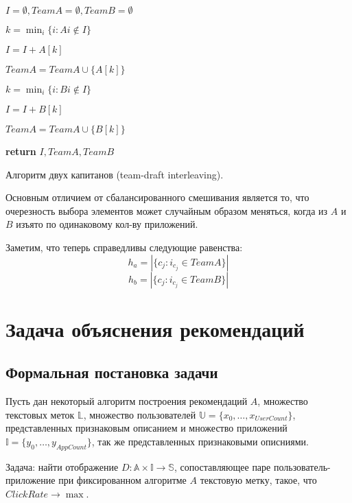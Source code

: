 \documentclass[12pt,a4paper]{report}
\begin{document}
\begin{algorithm}[H]
\SetAlgoLined
{}
$I = \emptyset, TeamA = \emptyset, TeamB = \emptyset$

 {
	 {
		$k=\min_i\{i: A{i}\notin I\}$
		
		$I = I + A[k]$
		
		$TeamA = TeamA \cup \{A[k]\}$
	} {
		$k=\min_i\{i: B{i}\notin I\}$
				
		$I = I + B[k]$
		
		$TeamA = TeamA \cup \{B[k]\}$
	}
}
\textbf{return} $I, TeamA, TeamB$
\caption{Алгоритм двух капитанов (team-draft interleaving).}
\label{alg:BI}
\end{algorithm}

Основным отличием от сбалансированного смешивания является то, что очерезность выбора элементов может случайным образом меняться, когда из $A$ и $B$ изъято по одинаковому кол-ву приложений.

Заметим, что теперь справедливы следующие равенства:
\begin{equation*}
h_a = |\{c_j: i_{c_j} \in TeamA\}|
\end{equation*}
\begin{equation*}
h_b = |\{c_j: i_{c_j} \in TeamB\}|
\end{equation*}

\chapter{Задача объяснения рекомендаций}
\section{Формальная постановка задачи}
Пусть дан некоторый алгоритм построения рекомендаций $A$, множество текстовых меток $\mathbb{L}$, множество пользователей $\mathbb{U} = \{x_0, \dots, x_{UserCount}\}$, представленных признаковым описанием и множество приложений  $\mathbb{I} = \{y_0, \dots, y_{AppCount}\}$, так же представленных признаковыми описниями.

Задача: найти отображение $D: \mathbb{A} \times \mathbb{I} \to \mathbb{S}$, сопоставляющее паре пользователь-приложение при фиксированном алгоритме $A$ текстовую метку, такое, что  $ClickRate \to \max$.
\end{document}
